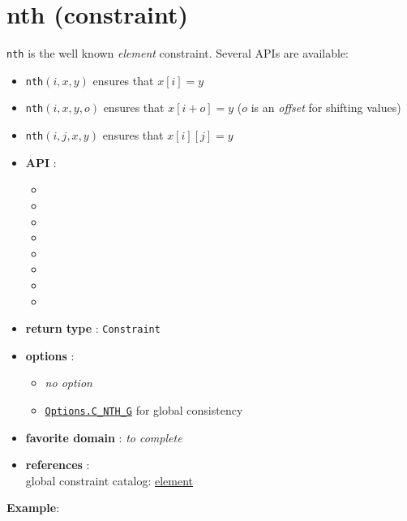 \label{nth}
\hypertarget{nth}{}

\section{nth (constraint)}\label{nth:nthconstraint}\hypertarget{nth:nthconstraint}{}
\texttt{nth} is the well known \emph{element} constraint.
Several APIs are available: 
\begin{notedef}
\begin{itemize}
\item \texttt{nth}$(i,x,y)$ ensures that $x[i]=y$
\item \texttt{nth}$(i,x,y,o)$ ensures that $x[i+o]=y$ ($o$ is an \emph{offset} for shifting values)
\item \texttt{nth}$(i,j,x,y)$ ensures that $x[i][j]=y$
\end{itemize}
\end{notedef}

\begin{itemize}
	\item \textbf{API} :
	\begin{itemize}
		\item {}
		\item {}
		\item {}
		\item {}
		\item {}		
		\item {}
		\item {}
		\item {}
	\end{itemize}
	\item \textbf{return type} : \texttt{Constraint}
	\item \textbf{options} :
	\begin{itemize}
		\item \emph{no option} 
		\item \hyperlink{cnthg:cnthgoptions}{\tt Options.C\_NTH\_G} for global consistency
	\end{itemize}
	\item \textbf{favorite domain} : \emph{to complete}
	\item \textbf{references} :\\
      global constraint catalog: \href{http://www.emn.fr/x-info/sdemasse/gccat/Celement.html}{element}
\end{itemize}

\textbf{Example}:
 
